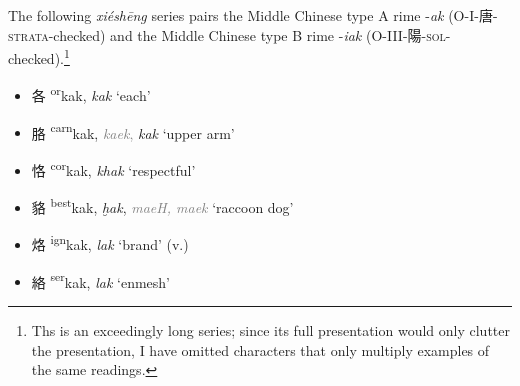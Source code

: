 The following \textit{xiéshēng} series pairs the Middle Chinese type A rime -\textit{ak} (O-I-唐-\textsc{strata}-checked) and the Middle Chinese type B rime -\textit{iak} (O-III-陽-\textsc{sol}-checked).\footnote{Ths is an exceedingly long series; since its full presentation would only clutter the presentation, I have omitted characters that only multiply examples of the same readings.} 

\begin{itemize}
    \item {\Large{各}} %
    {\large{{\textsuperscript{or}}kak}},
    \textit{kak} `each' %

    \item {\Large{胳}} %
    {\large{{\textsuperscript{carn}}kak}},
    \textcolor{gray}{\textit{kaek},} \textit{kak} `upper arm' %



    \item {\Large{恪}} %
    {\large{{\textsuperscript{cor}}kak}},
    \textit{khak} `respectful' %

    \item {\Large{貉}} %
    {\large{{\textsuperscript{best}}kak}},
    \textit{ḫak}, \textcolor{gray}{\textit{maeH, maek}} `raccoon dog' %



    \item {\Large{烙}} %
    {\large{{\textsuperscript{ign}}kak}},
    \textit{lak} `brand' (v.) %

    \item {\Large{絡}} %
    {\large{{\textsuperscript{ser}}kak}},
    \textit{lak} `enmesh' %

   


\end{itemize}

